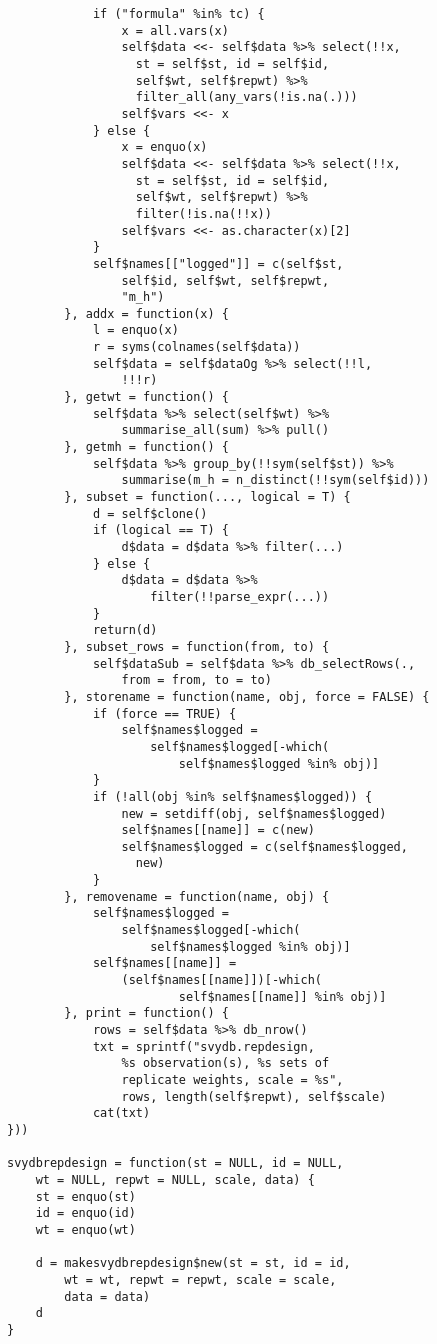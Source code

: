 \begin{lstlisting}
            if ("formula" %in% tc) {
                x = all.vars(x)
                self$data <<- self$data %>% select(!!x, 
                  st = self$st, id = self$id, 
                  self$wt, self$repwt) %>% 
                  filter_all(any_vars(!is.na(.)))
                self$vars <<- x
            } else {
                x = enquo(x)
                self$data <<- self$data %>% select(!!x, 
                  st = self$st, id = self$id, 
                  self$wt, self$repwt) %>% 
                  filter(!is.na(!!x))
                self$vars <<- as.character(x)[2]
            }
            self$names[["logged"]] = c(self$st, 
                self$id, self$wt, self$repwt, 
                "m_h")
        }, addx = function(x) {
            l = enquo(x)
            r = syms(colnames(self$data))
            self$data = self$dataOg %>% select(!!l, 
                !!!r)
        }, getwt = function() {
            self$data %>% select(self$wt) %>% 
                summarise_all(sum) %>% pull()
        }, getmh = function() {
            self$data %>% group_by(!!sym(self$st)) %>% 
                summarise(m_h = n_distinct(!!sym(self$id)))
        }, subset = function(..., logical = T) {
            d = self$clone()
            if (logical == T) {
                d$data = d$data %>% filter(...)
            } else {
                d$data = d$data %>% 
                    filter(!!parse_expr(...))
            }
            return(d)
        }, subset_rows = function(from, to) {
            self$dataSub = self$data %>% db_selectRows(., 
                from = from, to = to)
        }, storename = function(name, obj, force = FALSE) {
            if (force == TRUE) {
                self$names$logged = 
                    self$names$logged[-which(
                        self$names$logged %in% obj)]
            }
            if (!all(obj %in% self$names$logged)) {
                new = setdiff(obj, self$names$logged)
                self$names[[name]] = c(new)
                self$names$logged = c(self$names$logged, 
                  new)
            }
        }, removename = function(name, obj) {
            self$names$logged = 
                self$names$logged[-which(
                    self$names$logged %in% obj)]
            self$names[[name]] = 
                (self$names[[name]])[-which(
                        self$names[[name]] %in% obj)]
        }, print = function() {
            rows = self$data %>% db_nrow()
            txt = sprintf("svydb.repdesign, 
                %s observation(s), %s sets of 
                replicate weights, scale = %s", 
                rows, length(self$repwt), self$scale)
            cat(txt)
}))

svydbrepdesign = function(st = NULL, id = NULL, 
    wt = NULL, repwt = NULL, scale, data) {
    st = enquo(st)
    id = enquo(id)
    wt = enquo(wt)
    
    d = makesvydbrepdesign$new(st = st, id = id, 
        wt = wt, repwt = repwt, scale = scale, 
        data = data)
    d
}
\end{lstlisting}


